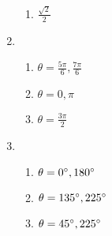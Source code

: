 \documentclass{article}
\begin{document}
\begin{enumerate}
\begin{enumerate}
	\item $\frac{\sqrt{2}}{2}$
	
	\end{enumerate}
	
\item

	\begin{enumerate}
	
	\item $\theta = \frac{5\pi}{6}, \frac{7\pi}{6}$
	
	\item $\theta = 0, \pi$
	
	\item $\theta = \frac{3\pi}{2}$
	
	\end{enumerate}
	
\item

	\begin{enumerate}
	
	\item $\theta = 0\degree, 180\degree$
	
	\item $\theta = 135\degree, 225\degree$
	
	\item $\theta = 45\degree, 225\degree$
	
	\end{enumerate}

\end{enumerate}
\end{document}
